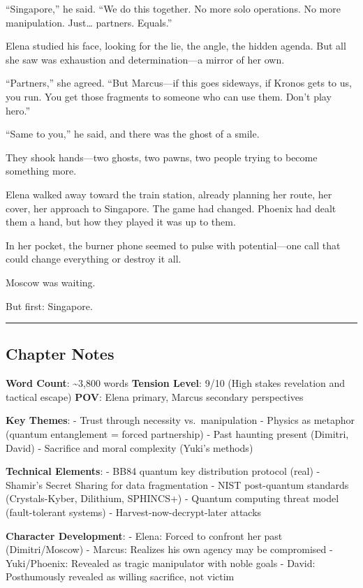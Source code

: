 \documentclass[12pt,letterpaper]{book}
\begin{document}
``Singapore,'' he said. ``We do this together. No more solo operations. No more manipulation. Just\ldots{} partners. Equals.''

Elena studied his face, looking for the lie, the angle, the hidden agenda. But all she saw was exhaustion and determination---a mirror of her own.

``Partners,'' she agreed. ``But Marcus---if this goes sideways, if Kronos gets to us, you run. You get those fragments to someone who can use them. Don't play hero.''

``Same to you,'' he said, and there was the ghost of a smile.

They shook hands---two ghosts, two pawns, two people trying to become something more.

Elena walked away toward the train station, already planning her route, her cover, her approach to Singapore. The game had changed. Phoenix had dealt them a hand, but how they played it was up to them.

In her pocket, the burner phone seemed to pulse with potential---one call that could change everything or destroy it all.

Moscow was waiting.

But first: Singapore.

\begin{center}\rule{0.5\linewidth}{0.5pt}\end{center}

\hypertarget{chapter-notes}{%
\subsection{Chapter Notes}\label{chapter-notes}}

\textbf{Word Count}: \textasciitilde3,800 words \textbf{Tension Level}: 9/10 (High stakes revelation and tactical escape) \textbf{POV}: Elena primary, Marcus secondary perspectives

\textbf{Key Themes}: - Trust through necessity vs.~manipulation - Physics as metaphor (quantum entanglement = forced partnership) - Past haunting present (Dimitri, David) - Sacrifice and moral complexity (Yuki's methods)

\textbf{Technical Elements}: - BB84 quantum key distribution protocol (real) - Shamir's Secret Sharing for data fragmentation - NIST post-quantum standards (Crystals-Kyber, Dilithium, SPHINCS+) - Quantum computing threat model (fault-tolerant systems) - Harvest-now-decrypt-later attacks

\textbf{Character Development}: - Elena: Forced to confront her past (Dimitri/Moscow) - Marcus: Realizes his own agency may be compromised - Yuki/Phoenix: Revealed as tragic manipulator with noble goals - David: Posthumously revealed as willing sacrifice, not victim
\end{document}
